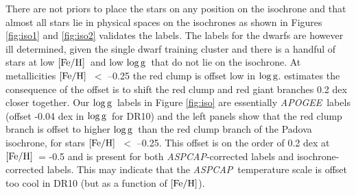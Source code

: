 \documentclass[12pt, preprint]{aastex}
\newcommand{\feh}{\mbox{$\rm [Fe/H]$}}
\newcommand{\logg}{\mbox{$\rm \log g$}}
\newcommand{\apogee}{\textsl{APOGEE}}
\newcommand{\aspcap}{\textsl{ASPCAP}}
\begin{document}
There are not priors to place the stars on any position on the isochrone and that almost all stars lie in physical spaces on the isochrones as shown in Figures \ref{fig:iso1} and \ref{fig:iso2} validates the labels. The labels for the dwarfs are however ill determined, given the single dwarf training cluster and there is a handful of stars at low \feh\ and low \logg\ that do not lie on the isochrone. At metallicities \feh\ $<$ --0.25 the red clump is offset low in \logg. \citet{bovy2014} estimates the consequence of the offset is to shift the red clump and red giant branches 0.2 dex closer together. Our \logg\ labels in Figure \ref{fig:iso} are essentially \apogee\ labels (offset -0.04 dex in \logg\ for DR10) and the left panels show that the red clump branch is offset to higher \logg\ than the red clump branch of the Padova isochrone, for stars \feh\ $<$ --0.25. This offset is on the order of 0.2 dex at \feh\ = -0.5 and is present for both \aspcap-corrected  labels and isochrone-corrected labels. This may indicate that the \aspcap\ temperature scale is offset too cool in DR10 (but as a function of \feh).

\end{document}
